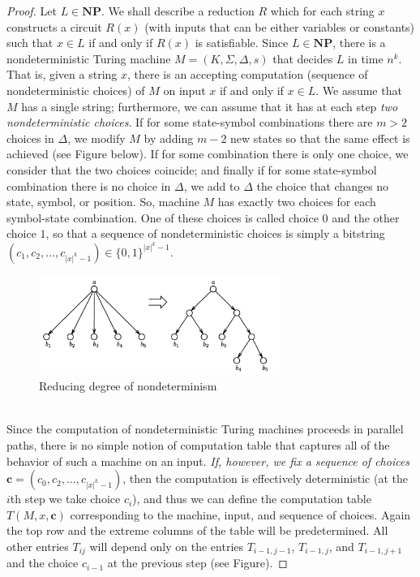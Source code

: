 \documentclass[12pt]{article}
\begin{document}
\begin{proof}
Let $L \in \mathbf{NP}$. We shall describe a reduction $R$ which for each string $x$ constructs a circuit $R(x)$ (with inputs that can be either variables or constants) such that $x \in L$ if and only if $R(x)$ is satisfiable. Since $L \in \mathbf{NP}$, there is a nondeterministic Turing machine $M = (K, \Sigma, \Delta, s)$ that decides $L$ in time $n^k$. That is, given a string $x$, there is an accepting computation (sequence of nondeterministic choices) of $M$ on input $x$ if and only if $x \in L$. We assume that $M$ has a single string; furthermore, we can assume that it has at each step \emph{two nondeterministic choices}.
 If for some state-symbol combinations there are $m > 2$ choices in $\Delta$, we modify $M$ by adding $m - 2$ new states so that the same effect is achieved (see Figure below). If for some combination there is only one choice, we consider that the two choices coincide; and finally if for some state-symbol combination there is no choice in $\Delta$, we add to $\Delta$ the choice that changes no state, symbol, or position. So, machine $M$ has exactly two choices for each symbol-state combination. One of these choices is called choice $0$ and the other choice $1$, so that a sequence of nondeterministic choices is simply a bitstring $(c_1, c_2, \ldots, c_{|x|^{k}-1}) \in \{0,1\}^{|x|^{k}-1}$.
 \begin{figure}[ht]
  \centering
  \includegraphics[width=0.7\textwidth]{img/cook.png}
  \caption{Reducing degree of nondeterminism}
\end{figure}
\\
Since the computation of nondeterministic Turing machines proceeds in parallel paths, there is no simple notion of computation table that captures all of the behavior of such a machine on an input. \emph{If, however, we fix a sequence of choices} $\mathbf{c} = (c_0, c_2, \ldots, c_{|x|^k - 1})$, then the computation is effectively deterministic (at the $i$th step we take choice $c_i$), and thus we can define the computation table $T(M, x, \mathbf{c})$ corresponding to the machine, input, and sequence of choices. Again the top row and the extreme columns of the table will be predetermined. All other entries $T_{ij}$ will depend only on the entries $T_{i-1,j-1}$, $T_{i-1,j}$, and $T_{i-1,j+1}$ and the choice $c_{i-1}$ at the previous step (see Figure).

\end{proof}
\end{document}
